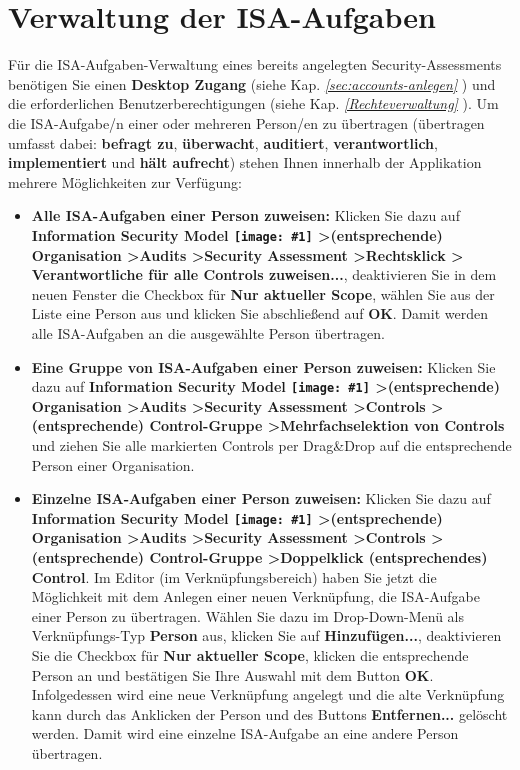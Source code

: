 \documentclass[a4paper,10pt]{book}
\newcommand{\icon}[1]{\texttt{[image: \#1]}}
\begin{document}
\section{Verwaltung der ISA-Aufgaben}
Für die ISA-Aufgaben-Verwaltung eines bereits angelegten Security-Assessments benötigen Sie einen \textbf{Desktop Zugang}
(siehe Kap. {\em \ref{sec:accounts-anlegen} }) und die erforderlichen Benutzerberechtigungen (siehe Kap. {\em \ref{Rechteverwaltung} }).
Um die ISA-Aufgabe/n einer oder mehreren Person/en zu übertragen (übertragen umfasst dabei: \textbf{befragt zu}, \textbf{überwacht}, \textbf{auditiert},
\textbf{verantwortlich}, \textbf{implementiert} und \textbf{hält aufrecht}) stehen Ihnen innerhalb der Applikation mehrere Möglichkeiten zur Verfügung:
\begin{itemize}
\item \textbf{Alle ISA-Aufgaben einer Person zuweisen:} Klicken Sie dazu auf \textbf{Information Security Model
\icon{Icon/Informationssicherheitsmodell.png} \textgreater (entsprechende) Organisation \textgreater Audits \textgreater Security Assessment \textgreater Rechtsklick \textgreater
Verantwortliche für alle Controls zuweisen...}, deaktivieren Sie in dem neuen Fenster die Checkbox für \textbf{Nur aktueller Scope},
wählen Sie aus der Liste eine Person aus und klicken Sie abschließend auf \textbf{OK}. Damit werden alle ISA-Aufgaben an die ausgewählte Person übertragen.
\item \textbf{Eine Gruppe von ISA-Aufgaben einer Person zuweisen:} Klicken Sie dazu auf \textbf{Information Security Model
\icon{Icon/Informationssicherheitsmodell.png} \textgreater (entsprechende) Organisation \textgreater Audits \textgreater Security Assessment \textgreater Controls \textgreater
(entsprechende) Control-Gruppe \textgreater Mehrfachselektion von Controls} und ziehen Sie alle markierten Controls per Drag\&Drop auf die entsprechende Person
einer Organisation.
\item \textbf{Einzelne ISA-Aufgaben einer Person zuweisen:} Klicken Sie dazu auf \textbf{Information Security Model
\icon{Icon/Informationssicherheitsmodell.png} \textgreater (entsprechende) Organisation \textgreater Audits \textgreater Security Assessment \textgreater Controls \textgreater
(entsprechende) Control-Gruppe \textgreater Doppelklick (entsprechendes) Control}. Im Editor (im Verknüpfungsbereich) haben Sie jetzt die Möglichkeit mit
dem Anlegen einer neuen Verknüpfung, die ISA-Aufgabe einer Person zu übertragen. Wählen Sie dazu im Drop-Down-Menü als Verknüpfungs-Typ \textbf{Person} aus,
klicken Sie auf \textbf{Hinzufügen...}, deaktivieren Sie die Checkbox für \textbf{Nur aktueller Scope}, klicken die entsprechende Person an und bestätigen
Sie Ihre Auswahl mit dem Button \textbf{OK}. Infolgedessen wird eine neue Verknüpfung angelegt und die alte Verknüpfung kann durch das Anklicken der Person
und des Buttons \textbf{Entfernen...} gelöscht werden. Damit wird eine einzelne ISA-Aufgabe an eine andere Person übertragen.
\end{itemize}
\end{document}
